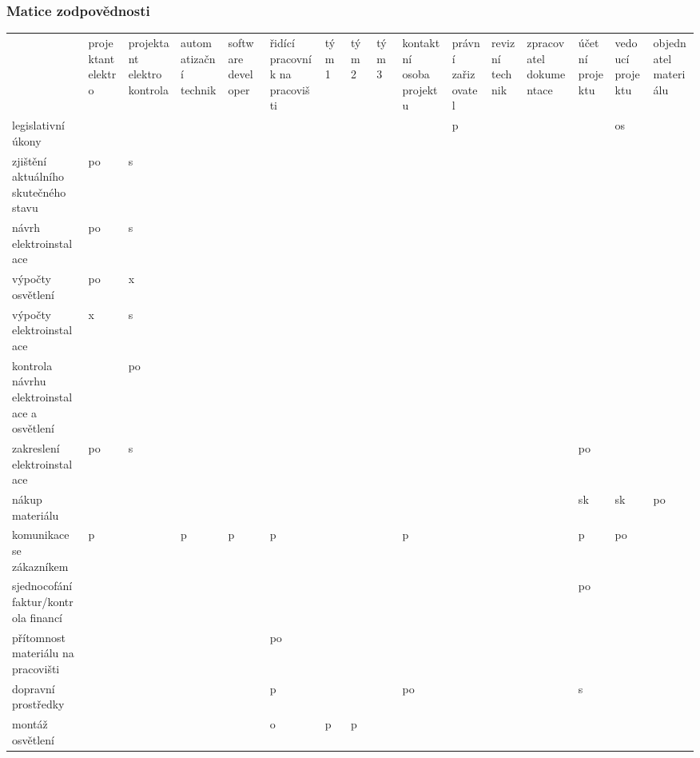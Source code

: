 \documentclass[a4paper, twoside, 11pt]{article}
\begin{document}
	\subsubsection{Matice zodpovědnosti}
		\begin{table}[H]
		\resizebox{1 \textwidth}{!}
		{
		
			\begin{tabular}{ !{\vrule width 2pt} p{3cm} !{\vrule width 2pt} p{1.5cm} | p{2cm} | p{2cm} | p{2cm} | p{2cm} | p{0.75cm} | p{0.75cm} | p{0.75cm} | p{2cm} | p{2cm} | p{2cm} | p{2cm} | p{2cm} | p{2cm} | p{2cm} !{\vrule width 2pt} }
				 & projektant elektro & projektant elektro kontrola & automatizační technik & software developer & řidící pracovník na pracovišti & tým 1 & tým 2 & tým 3 & kontaktní osoba projektu & právní zařizovatel & revizní technik & zpracovatel dokumentace & účetní projektu & vedoucí projektu & objednatel materiálu \\ 
	legislativní úkony &  &  &  &  &  &  &  &  &  & p &  &  &  & os &  \\ \hline
	zjištění aktuálního skutečného stavu & po & s~&  &  &  &  &  &  &  &  &  &  &  &  &  \\ \hline
	návrh elektroinstalace & po & s~&  &  &  &  &  &  &  &  &  &  &  &  &  \\ \hline
	výpočty osvětlení & po & x &  &  &  &  &  &  &  &  &  &  &  &  &  \\ \hline
	výpočty elektroinstalace & x & s~&  &  &  &  &  &  &  &  &  &  &  &  &  \\ \hline
	kontrola návrhu elektroinstalace a osvětlení &  & po &  &  &  &  &  &  &  &  &  &  &  &  &  \\ \hline
	zakreslení elektroinstalace & po & s~&  &  &  &  &  &  &  &  &  &  & po &  &  \\ \hline
	nákup materiálu &  &  &  &  &  &  &  &  &  &  &  &  & sk & sk & po \\ \hline
	komunikace se zákazníkem & p &  & p & p & p &  &  &  & p &  &  &  & p &  po &  \\ \hline
	sjednocofání faktur/kontrola financí &  &  &  &  &  &  &  &  &  &  &  &  & po &  &  \\ \hline
	přítomnost materiálu na pracovišti &  &  &  &  & po &  &  &  &  &  &  &  &  &  &  \\ \hline
	dopravní prostředky &  &  &  &  & p &  &  &  & po &  &  &  & s~&  &  \\ \hline
	montáž osvětlení &  &  &  &  & o~& p & p &  &  &  &  &  &  &  &  \\ \hline

\end{tabular}}
\end{table}
\end{document}

